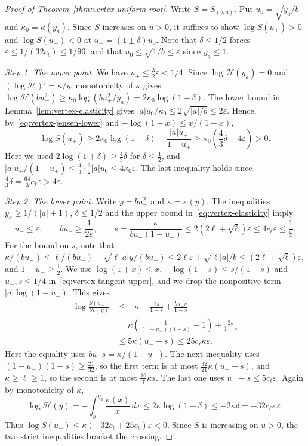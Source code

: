 \begin{proof}[Proof of Theorem~\ref{thm:vertex-uniform-root}]
Write $S=S_{(b,a)}$. Put $u_0=\sqrt{y_a/b}$ and $\kappa_0=\kappa(y_a)$. Since
$S$ increases on $u>0$, it suffices to show $\log S(u_+)>0$ and
$\log S(u_-)<0$ at $u_\pm=(1\pm\delta)u_0$. Note that $\delta\le1/2$ forces
$\varepsilon\le1/(32c_\ell)\le1/96$, and that $u_0\le\sqrt{1/b}\le\varepsilon$
since $y_a\le1$.

\emph{Step 1. The upper point.} We have $u_+\le\tfrac32\varepsilon<1/4$. Since
$\log\mathcal H(y_a)=0$ and $(\log\mathcal H)'=\kappa/y$, monotonicity of $\kappa$ gives
$\log\mathcal H(bu_+^2)\ge\kappa_0\log(bu_+^2/y_a)=2\kappa_0\log(1+\delta)$. The lower
bound in Lemma~\ref{lem:vertex-elasticity} gives
$|a|u_0/\kappa_0\le2\sqrt{|a|/b}\le2\varepsilon$. Hence,
by~\eqref{eq:vertex-jensen-lower} and $-\log(1-x)\le x/(1-x)$,
\[
 \log S(u_+)\ge
 2\kappa_0\log(1+\delta)-\frac{|a|u_+}{1-u_+}
 \ge\kappa_0\left(\frac43\delta-4\varepsilon\right)>0.
\]
Here we used $2\log(1+\delta)\ge\frac43\delta$ for $\delta\le\frac12$, and
$|a|u_+/(1-u_+)\le\frac43\cdot\frac32|a|u_0\le4\kappa_0\varepsilon$. The last
inequality holds since $\frac43\delta=\frac{64}3c_\ell\varepsilon>4\varepsilon$.

\emph{Step 2. The lower point.} Write $y=bu_-^2$ and $\kappa=\kappa(y)$. The
inequalities $y_a\ge1/(|a|+1)$, $\delta\le1/2$ and the upper bound
in~\eqref{eq:vertex-elasticity} imply
\[
 u_-\le\varepsilon,\qquad bu_-\ge\frac1{2\varepsilon},\qquad
 s=\frac{\kappa}{bu_-(1-u_-)}
 \le 2(2\ell+\sqrt\ell)\varepsilon\le4c_\ell\varepsilon\le\frac18.
\]
For the bound on $s$, note that
$\kappa/(bu_-)\le\ell/(bu_-)+\sqrt{\ell|a|y}/(bu_-)\le2\ell\varepsilon+\sqrt{\ell|a|/b}
\le(2\ell+\sqrt\ell)\varepsilon$, and $1-u_-\ge\frac12$. We use
$\log(1+x)\le x$, $-\log(1-s)\le s/(1-s)$ and $u_-,s\le1/4$
in~\eqref{eq:vertex-tangent-upper}, and we drop the nonpositive term
$|a|\log(1-u_-)$. This gives
\begin{align*}
 \log\frac{S(u_-)}{\mathcal H(y)}
 &\le -\kappa+\frac{2s}{1-s}+\frac{bu_-s}{1-s}\\
 &=\kappa\left(\frac1{(1-u_-)(1-s)}-1\right)
       +\frac{2s}{1-s}\\
 &\le 5\kappa(u_-+s)\le25c_\ell\kappa\varepsilon.
\end{align*}
Here the equality uses $bu_-s=\kappa/(1-u_-)$. The next inequality uses
$(1-u_-)(1-s)\ge\frac{21}{32}$, so the first term is at most
$\frac{32}{21}\kappa(u_-+s)$, and $\kappa\ge\ell\ge1$, so the second is at most
$\frac{16}7\kappa s$. The last one uses $u_-+s\le5c_\ell\varepsilon$. Again by
monotonicity of $\kappa$,
\[
 \log\mathcal H(y)=-\int_y^{y_a}\frac{\kappa(x)}x\,dx\le2\kappa\log(1-\delta)\le-2\kappa\delta
 =-32c_\ell\kappa\varepsilon.
\]
Thus $\log S(u_-)\le\kappa(-32c_\ell+25c_\ell)\varepsilon<0$. Since $S$ is
increasing on $u>0$, the two strict inequalities bracket the crossing.
\end{proof}
